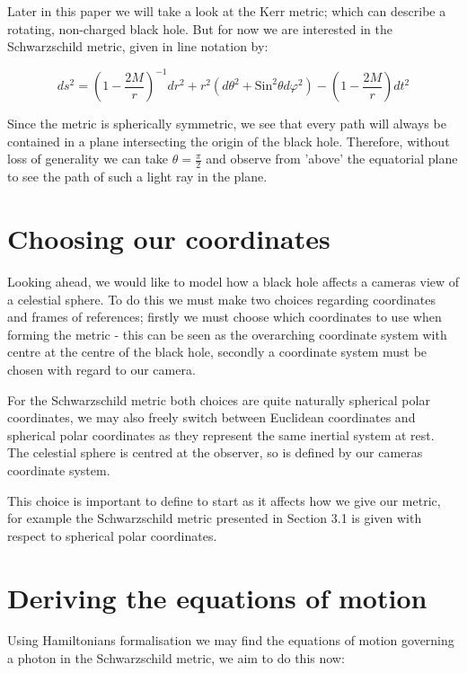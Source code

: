 \documentclass[oneside,openright,frontopenright, singlespacing]{dmathesis}
\begin{document}
\vspace{1em}
Later in this paper we will take a look at the Kerr metric; which can describe a rotating, non-charged black hole. But for now we are interested in the Schwarzschild metric, given in line notation by: 

	\[{ds^{2} = {\left(1-\frac {2M}{r}\right)}^{-1}} {dr^2} + {r^2}({d\theta ^2} + {\mbox{Sin} ^2}{\theta}{d\varphi ^2}) -{\left(1-\frac {2M}{r}\right)}{dt^2}\]

\vspace{1em}
	Since the metric is spherically symmetric, we see that every path will always be contained in a plane intersecting the origin of the black hole. Therefore, without loss of generality we can take ${\theta}=\frac{\pi}{2}$ and observe from 'above’ the equatorial plane to see the path of such a light ray in the plane.

\section{Choosing our coordinates}

	Looking ahead, we would like to model how a black hole affects a cameras view of a celestial sphere. To do this we must make two choices regarding coordinates and frames of references; firstly we must choose which coordinates to use when forming the metric - this can be seen as the overarching coordinate system with centre at the centre of the black hole, secondly a coordinate system must be chosen with regard to our camera.

\vspace{1em}
	For the Schwarzschild metric both choices are quite naturally spherical polar coordinates, we may also freely switch between Euclidean coordinates and spherical polar coordinates as they represent the same inertial system at rest. The celestial sphere is centred at the observer, so is defined by our cameras coordinate system.

\vspace{1em}
	This choice is important to define to start as it affects how we give our metric, for example the Schwarzschild metric presented in Section 3.1 is given with respect to spherical polar coordinates.

\section{Deriving the equations of motion}
	
	Using Hamiltonians formalisation we may find the equations of motion governing a photon in the Schwarzschild metric, we aim to do this now:
\end{document}
